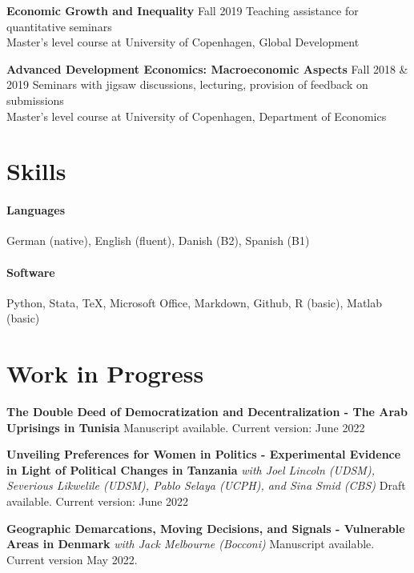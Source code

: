 \documentclass[10pt,a4paper]{article}
\begin{document}
\textbf{Economic Growth and Inequality} \hfill Fall 2019
\newline
Teaching assistance for quantitative seminars \\
Master's level course at
University of Copenhagen, Global Development
\vspace{1em}

\textbf{Advanced Development Economics: Macroeconomic Aspects} \hfill Fall 2018 \& 2019
\newline
Seminars with jigsaw discussions, lecturing, provision of feedback on submissions \\
Master's level course at
University of Copenhagen, Department of Economics




\section*{Skills}
\paragraph*{Languages}
German (native), English (fluent), Danish (B2), Spanish (B1)

\paragraph*{Software}
Python, Stata, \TeX, Microsoft Office, Markdown,
Github, R (basic), Matlab (basic)

\section*{Work in Progress}
\textbf{The Double Deed of Democratization and Decentralization - The Arab Uprisings in Tunisia}
\newline
Manuscript available. Current version: June 2022
\vspace{1em}

\textbf{Unveiling Preferences for Women in Politics -
Experimental Evidence in Light of Political Changes in Tanzania}
\newline
\emph{with Joel Lincoln (UDSM), Severious Likwelile (UDSM), Pablo Selaya (UCPH), and Sina Smid (CBS)}
\newline
Draft available. Current version: June 2022
\vspace{1em}

\textbf{Geographic Demarcations, Moving Decisions, and Signals -
Vulnerable Areas in Denmark}
\newline
\emph{with Jack Melbourne (Bocconi)}
\newline
Manuscript available. Current version May 2022.
\vspace{1em}
\end{document}

